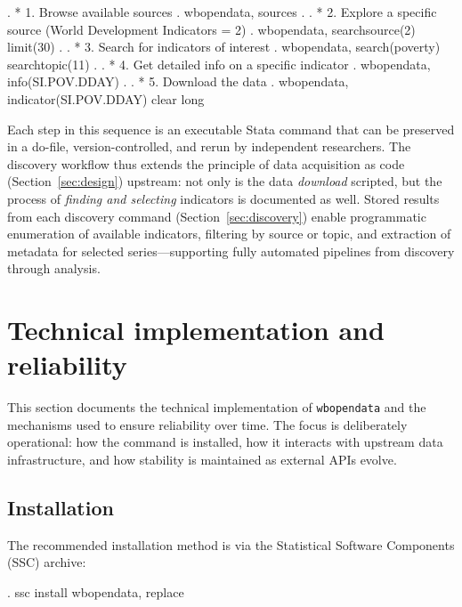 \documentclass[bib]{statapress}
\begin{document}
\begin{stlog}
.     * 1. Browse available sources
.     wbopendata, sources
.
.     * 2. Explore a specific source (World Development Indicators = 2)
.     wbopendata, searchsource(2) limit(30)
.
.     * 3. Search for indicators of interest
.     wbopendata, search(poverty) searchtopic(11)
.
.     * 4. Get detailed info on a specific indicator
.     wbopendata, info(SI.POV.DDAY)
.
.     * 5. Download the data
.     wbopendata, indicator(SI.POV.DDAY) clear long
\nullskip
\end{stlog}

Each step in this sequence is an executable Stata command that can be
preserved in a do-file, version-controlled, and rerun by independent
researchers. The discovery workflow thus extends the principle of data
acquisition as code (Section~\ref{sec:design}) upstream: not only is the
data \emph{download} scripted, but the process of \emph{finding and selecting}
indicators is documented as well. Stored results from each discovery command
(Section~\ref{sec:discovery}) enable programmatic enumeration of available
indicators, filtering by source or topic, and extraction of metadata for
selected series---supporting fully automated pipelines from discovery through
analysis.

\section{Technical implementation and reliability}\label{sec:reliability}

This section documents the technical implementation of \texttt{wbopendata} and
the mechanisms used to ensure reliability over time. The focus is deliberately
operational: how the command is installed, how it interacts with upstream data
infrastructure, and how stability is maintained as external APIs evolve.

\subsection{Installation}

The recommended installation method is via the Statistical Software Components
(SSC) archive:

\begin{stlog}
. ssc install wbopendata, replace
\nullskip
\end{stlog}
\end{document}
